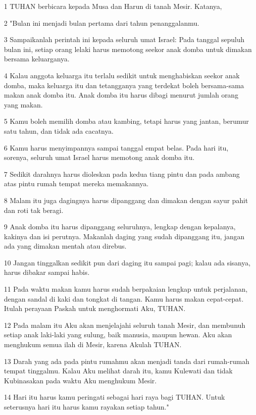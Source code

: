\par 1 TUHAN berbicara kepada Musa dan Harun di tanah Mesir. Katanya,
\par 2 "Bulan ini menjadi bulan pertama dari tahun penanggalanmu.
\par 3 Sampaikanlah perintah ini kepada seluruh umat Israel: Pada tanggal sepuluh bulan ini, setiap orang lelaki harus memotong seekor anak domba untuk dimakan bersama keluarganya.
\par 4 Kalau anggota keluarga itu terlalu sedikit untuk menghabiskan seekor anak domba, maka keluarga itu dan tetangganya yang terdekat boleh bersama-sama makan anak domba itu. Anak domba itu harus dibagi menurut jumlah orang yang makan.
\par 5 Kamu boleh memilih domba atau kambing, tetapi harus yang jantan, berumur satu tahun, dan tidak ada cacatnya.
\par 6 Kamu harus menyimpannya sampai tanggal empat belas. Pada hari itu, sorenya, seluruh umat Israel harus memotong anak domba itu.
\par 7 Sedikit darahnya harus dioleskan pada kedua tiang pintu dan pada ambang atas pintu rumah tempat mereka memakannya.
\par 8 Malam itu juga dagingnya harus dipanggang dan dimakan dengan sayur pahit dan roti tak beragi.
\par 9 Anak domba itu harus dipanggang seluruhnya, lengkap dengan kepalanya, kakinya dan isi perutnya. Makanlah daging yang sudah dipanggang itu, jangan ada yang dimakan mentah atau direbus.
\par 10 Jangan tinggalkan sedikit pun dari daging itu sampai pagi; kalau ada sisanya, harus dibakar sampai habis.
\par 11 Pada waktu makan kamu harus sudah berpakaian lengkap untuk perjalanan, dengan sandal di kaki dan tongkat di tangan. Kamu harus makan cepat-cepat. Itulah perayaan Paskah untuk menghormati Aku, TUHAN.
\par 12 Pada malam itu Aku akan menjelajahi seluruh tanah Mesir, dan membunuh setiap anak laki-laki yang sulung, baik manusia, maupun hewan. Aku akan menghukum semua ilah di Mesir, karena Akulah TUHAN.
\par 13 Darah yang ada pada pintu rumahmu akan menjadi tanda dari rumah-rumah tempat tinggalmu. Kalau Aku melihat darah itu, kamu Kulewati dan tidak Kubinasakan pada waktu Aku menghukum Mesir.
\par 14 Hari itu harus kamu peringati sebagai hari raya bagi TUHAN. Untuk seterusnya hari itu harus kamu rayakan setiap tahun."
